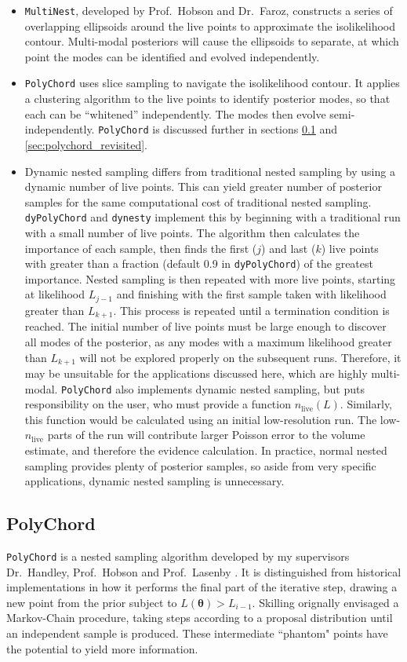\documentclass{article}
\begin{document}
\begin{itemize}
  \item \texttt{MultiNest}, developed by Prof.~Hobson and Dr.~Faroz, constructs a series of overlapping ellipsoids around the live points to approximate the isolikelihood contour. Multi-modal posteriors will cause the ellipsoids to separate, at which point the modes can be identified and evolved independently. 
  \item \texttt{PolyChord} uses slice sampling to navigate the isolikelihood contour. It applies a clustering algorithm to the live points to identify posterior modes, so that each can be ``whitened'' independently. The modes then evolve semi-independently. \texttt{PolyChord} is discussed further in sections \ref{sec:poly} and \ref{sec:polychord_revisited}.
  \item Dynamic nested sampling differs from traditional nested sampling by using a dynamic number of live points. This can yield greater number of posterior samples for the same computational cost of traditional nested sampling. \texttt{dyPolyChord} and \texttt{dynesty} implement this by beginning with a traditional run with a small number of live points. The algorithm then calculates the importance of each sample, then finds the first ($j$) and last ($k$) live points with greater than a fraction (default 0.9 in \texttt{dyPolyChord}) of the greatest importance. Nested sampling is then repeated with more live points, starting at likelihood $L_{j-1}$ and finishing with the first sample taken with likelihood greater than $L_{k+1}$. This process is repeated until a termination condition is reached. The initial number of live points must be large enough to discover all modes of the posterior, as any modes with a maximum likelihood greater than $L_{k+1}$ will not be explored properly on the subsequent runs. Therefore, it may be unsuitable for the applications discussed here, which are highly multi-modal. \texttt{PolyChord} also implements dynamic nested sampling, but puts responsibility on the user, who must provide a function $n_\textrm{live}(L)$. Similarly, this function would be calculated using an initial low-resolution run. The low-$n_\textrm{live}$ parts of the run will contribute larger Poisson error to the volume estimate, and therefore the evidence calculation. In practice, normal nested sampling provides plenty of posterior samples, so aside from very specific applications, dynamic nested sampling is unnecessary.
\end{itemize}


\subsection{PolyChord}
\label{sec:poly}
\texttt{PolyChord} is a nested sampling algorithm developed by my supervisors Dr.~Handley, Prof.~Hobson and Prof.~Lasenby \cite{PolyChord_1, PolyChord_2}. It is distinguished from historical implementations in how it performs the final part of the iterative step, drawing a new point from the prior subject to $L(\bm\theta)>L_{i-1}$. Skilling orignally envisaged a Markov-Chain procedure, taking steps according to a proposal distribution until an independent sample is produced. These intermediate ``phantom" points have the potential to yield more information.
\end{document}
